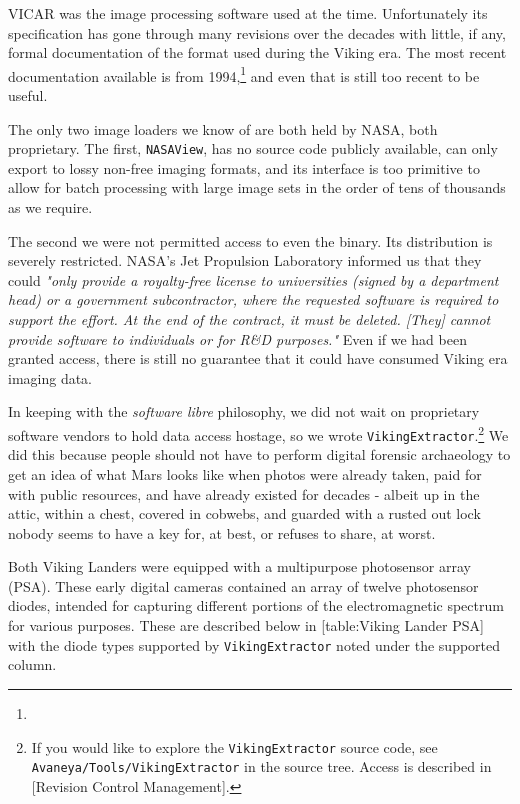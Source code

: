 VICAR was the image processing software used at the time. Unfortunately its specification has gone through many revisions over the decades with little, if any, formal documentation of the format used during the Viking era. The most recent documentation available is from 1994,\footnote{} and even that is still too recent to be useful.

The only two image loaders we know of are both held by NASA, both proprietary. The first, {\tt NASAView}, has no source code publicly available, can only export to lossy non-free imaging formats, and its interface is too primitive to allow for batch processing with large image sets in the order of tens of thousands as we require. 

The second we were not permitted access to even the binary. Its distribution is severely restricted. NASA's Jet Propulsion Laboratory informed us that they could {\it "only provide a royalty-free license to universities (signed by a department head) or a government subcontractor, where the requested software is required to support the effort. At the end of the contract, it must be deleted. [They] cannot provide software to individuals or for R&D purposes."} Even if we had been granted access, there is still no guarantee that it could have consumed Viking era imaging data.


In keeping with the {\it software libre} philosophy, we did not wait on proprietary software vendors to hold data access hostage, so we wrote {\tt VikingExtractor}.\footnote{If you would like to explore the {\tt VikingExtractor} source code, see {\tt Avaneya/Tools/VikingExtractor} in the source tree. Access is described in [Revision Control Management].} We did this because people should not have to perform digital forensic archaeology to get an idea of what Mars looks like when photos were already taken, paid for with public resources, and have already existed for decades - albeit up in the attic, within a chest, covered in cobwebs, and guarded with a rusted out lock nobody seems to have a key for, at best, or refuses to share, at worst.

Both Viking Landers were equipped with a multipurpose photosensor array (PSA). These early digital cameras contained an array of twelve photosensor diodes, intended for capturing different portions of the electromagnetic spectrum for various purposes. These are described below in [table:Viking Lander PSA] with the diode types supported by {\tt VikingExtractor} noted under the supported column.

